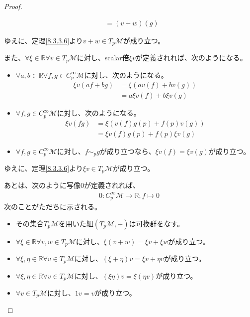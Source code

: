 \documentclass[dvipdfmx]{jsarticle}
\begin{document}
\begin{proof}
\begin{itemize}
\begin{align*}
      &=\left(v+w\right)\left(g\right) 
    \end{align*}
\end{itemize}
  ゆえに、定理\ref{8.3.3.6}より$v+w\in T_p \mathcal{M}$が成り立つ。\par
  また、$\forall \xi \in \mathbb{R}\forall v\in T_p \mathcal{M}$に対し、scalar倍$\xi v$が定義されれば、次のようになる。
  \begin{itemize}
    \item $\forall a,b\in \mathbb{R} \forall f,g\in C^\infty_p \mathcal{M}$に対し、次のようになる。
    \begin{align*}
      \xi v\left(af+bg\right) &= \xi \left( av\left(f\right) +bv\left(g\right) \right) \\
      &= a\xi v\left(f\right) +b\xi v\left(g\right)
    \end{align*}
    \item $\forall f,g\in C^\infty_p \mathcal{M}$に対し、次のようになる。
    \begin{align*}
      \xi v\left(fg\right) &= \xi \left( v\left(f\right) g\left(p\right) +f\left(p\right) v\left(g\right) \right)\\
      &= \xi v\left(f\right) g\left(p\right) +f\left(p\right) \xi v\left(g\right) 
    \end{align*}
    \item $\forall f,g\in C^\infty_p \mathcal{M}$に対し、$f\sim_p g$が成り立つなら、$\xi v\left(f\right) = \xi v\left(g\right)$が成り立つ。
    \end{itemize}
  ゆえに、定理\ref{8.3.3.6}より$\xi v\in T_p \mathcal{M}$が成り立つ。\par
  あとは、次のように写像$0$が定義されれば、
  \begin{align*}
    0:C^\infty_p \mathcal{M} \rightarrow \mathbb{R};f\mapsto 0
  \end{align*}
  次のことがただちに示される。
  \begin{itemize}
    \item その集合$T_p \mathcal{M}$を用いた組$\left(T_p \mathcal{M},+\right)$は可換群をなす。
    \item $\forall \xi \in \mathbb{R} \forall v,w\in T_p \mathcal{M}$に対し、$\xi \left(v+w\right)=\xi v+\xi w$が成り立つ。
    \item $\forall \xi ,\eta \in \mathbb{R} \forall v\in T_p \mathcal{M}$に対し、$\left(\xi +\eta\right)v=\xi v+\eta v$が成り立つ。
    \item $\forall \xi ,\eta \in \mathbb{R} \forall v\in T_p \mathcal{M}$に対し、$\left(\xi \eta\right)v=\xi \left( \eta v\right) $が成り立つ。
    \item $\forall v\in T_p \mathcal{M}$に対し、$1v=v$が成り立つ。
  \end{itemize}
\end{proof}
\end{document}
